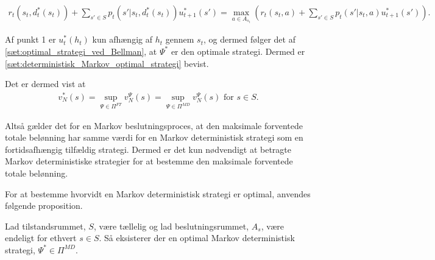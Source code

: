 \begin{bev}
\begin{align*}
    r_t\left(s_t,d_t^*(s_t)\right) + \sum_{s'\in S}p_t\left(s' | s_t, d_t^*(s_t)\right)u^*_{t+1}(s')\nonumber 
    = \max_{a \in A_{s_t}}\left(r_t(s_t,a) +  \sum_{s'\in S}p_t(s' | s_t,a)u^*_{t+1}(s')\right).
\end{align*}

Af punkt 1 er $u_t^*(h_t)$ kun afhængig af $h_t$ gennem $s_t$, og dermed følger det af \autoref{sæt:optimal_strategi_ved_Bellman}, at $\Psi^*$ er den optimale strategi.
Dermed er \autoref{sæt:deterministisk_Markov_optimal_strategi} bevist.
\end{bev}

Det er dermed vist at
\begin{align*}
    v_N^*(s)=\sup_{\Psi\in\Pi^{FT}}v_N^\Psi(s)=\sup_{\Psi\in\Pi^{MD}}v_N^\Psi(s) \text{ for } s\in S.
\end{align*}

Altså gælder det for en Markov beslutningsproces, at den maksimale forventede totale belønning har samme værdi for en Markov deterministisk strategi som en fortidsafhængig tilfældig strategi. Dermed er det kun nødvendigt at betragte Markov deterministiske strategier for at bestemme den maksimale forventede totale belønning. 

For at bestemme hvorvidt en Markov deterministisk strategi er optimal, anvendes følgende proposition. 

\begin{minipage}\textwidth
\begin{pro} \textbf{}\label{prop:markov_det_strategi} %
\newline
Lad tilstandsrummet, $S$, være tællelig og lad beslutningsrummet, $A_s$, være endeligt for ethvert $s\in S$. Så eksisterer der en optimal Markov deterministisk strategi, $\Psi^*\in \Pi^{MD}$.  
\end{pro}
\end{minipage}

